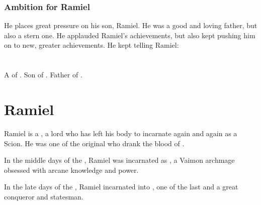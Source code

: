 \subsubsection{Ambition for Ramiel}
He places great pressure on his son, Ramiel. 
He was a good and loving father, but also a stern one. 
He applauded Ramiel's achievements, but also kept pushing him on to new, greater achievements. 
He kept telling Ramiel: 















\section{\Ozariel}
\index{\Ozariel}
A \ketheran{} \resphan{} of \Mystraacht. 
Son of . 
Father of . 















\section{Ramiel}
Ramiel is a \Malach, a \resphan{} lord who has left his \resphan{} body to incarnate again and again as a \human{} Scion. 
He was one of the original \satharioth{} who drank the blood of \Nexagglachel. 


In the middle days of the \VaimonCaliphate, Ramiel was incarnated as , a Vaimon archmage obsessed with arcane knowledge and power. 

In the late days of the \caliphate, Ramiel incarnated into , one of the last \VaimonCaliphs and a great conqueror and statesman. 

